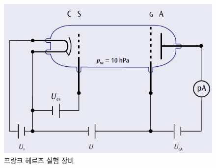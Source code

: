 \documentclass[%
 reprint,
 amsmath,amssymb,
 aps,
]{revtex4-2}
\begin{document}
\begin{figure}[htbp]
	\includegraphics[width = 0.85\linewidth]{EXP.png}%
	\caption{\label{fig:EXP}프랑크 헤르츠 실험 장비}
\end{figure}
\end{document}
